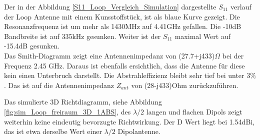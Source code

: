 Der in der  Abbildung \ref{S11_Loop_Vergleich_Simulation} dargestellte $S_{11}$ verlauf der Loop Antenne mit einem Kunsstoffstück, ist als blaue Kurve gezeigt. Die Resonanzfrequenz ist um mehr als 1430MHz auf 4.41GHz gefallen. Die -10dB Bandbreite ist auf 335kHz gesunken. Weiter ist der $S_{11}$ maximal Wert auf -15.4dB gesunken.\\
Das Smith-Diagramm zeigt eine Antennenimpedanz von (27.7+j433)$\Omega$ bei der Frequenz 2.45 GHz. Daraus ist ebenfalls ersichtlich, dass die Antenne für diese kein einen Unterbruch darstellt. Die Abstrahleffizienz bleibt sehr tief bei unter $3\%$. Das ist auf die Antennenimpedanz $Z_{ant}$ von (28-j433)Ohm zurückzuführen.


Das simulierte 3D Richtdiagramm, siehe Abbildung \ref{fig:sim_Loop_freiraum_3D_1ABS}, des $\lambda/2$ langen und flachen Dipols zeigt weiterhin keine eindeutig bevorzugte Richtwirkung. Der D Wert liegt bei 1.54dBi, das ist etwa derselbe Wert einer $\lambda/2$ Dipolantenne. 

